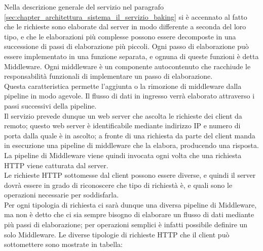 Nella descrizione generale del servizio nel paragrafo \ref{sec:chapter_architettura_sistema_il_servizio_baking} si è accennato al fatto che le richieste sono elaborate dal server in modo differente a seconda del loro tipo, e che le elaborazioni più complesse possono essere decomposte in una successione di passi di elaborazione più piccoli. Ogni passo di elaborazione può essere implementato in una funzione separata, e ognuna di queste funzioni è detta Middleware. Ogni middleware è un componente autocontenuto che racchiude le responsabilità funzionali di implementare un passo di elaborazione.
\\
Questa caratteristica permette l’aggiunta o la rimozione di middleware dalla pipeline in modo agevole. Il flusso di dati in ingresso verrà elaborato attraverso i passi successivi della pipeline. 
\\
Il servizio prevede dunque un web server che ascolta le richieste dei client da remoto; questo web server è identificabile mediante indirizzo IP e numero di porta dalla quale è in ascolto; a fronte di una richiesta da parte del client manda in esecuzione una pipeline di middleware che la elabora, producendo una risposta. La pipeline di Middleware viene quindi invocata ogni volta che una richiesta HTTP viene catturata dal server. 
\\
Le richieste HTTP sottomesse dal client possono essere diverse, e quindi il server dovrà essere in grado di riconoscere che tipo di richiestà è, e quali sono le operazioni necessarie per soddisfarla. 
\\
Per ogni tipologia di richiesta ci sarà dunque una diversa pipeline di Middleware, ma non è detto che ci sia sempre bisogno di elaborare un flusso di dati mediante più passi di elaborazione; per operazioni semplici è infatti possibile definire un solo Middleware. 
Le diverse tipologie di richieste HTTP che il client può sottomettere sono mostrate in tabella:
